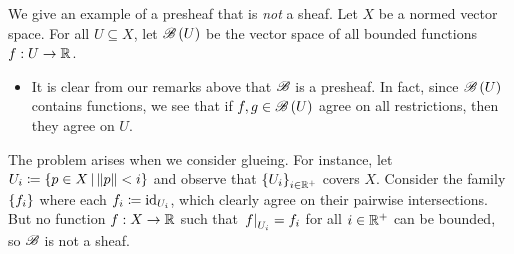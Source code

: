 \documentclass[../Moduli_Spaces_of_Riemann_Surfaces.tex]{subfiles}
\begin{document}
    \vspace{-0.05in}
    \begin{example}
        We give an example of a presheaf that is \textit{not} a sheaf. Let $X$ be a normed vector space. For all $U\subseteq X$, let $\mathscr{B}\left(U\right)$ be the vector space of all bounded functions $f:U\to\mathbb{R}$.
        \begin{itemize}
            \item It is clear from our remarks above that $\mathscr{B}$ is a presheaf. In fact, since $\mathscr{B}\left(U\right)$ contains functions, we see that if $f,g\in\mathscr{B}\left(U\right)$ agree on all restrictions, then they agree on $U$.
        \end{itemize}
        The problem arises when we consider glueing. For instance, let $U_i\coloneqq\left\{p\in X\,\middle\vert\,\left\|p\right\|<i\right\}$ and observe that $\left\{U_i\right\}_{i\in\mathbb{R}^+}$ covers $X$. Consider the family $\left\{f_i\right\}$ where each $f_i\coloneqq\operatorname{id}_{U_i}$, which clearly agree on their pairwise intersections. But no function $f:X\to\mathbb{R}$ such that $\left.f\right|_{U_i}=f_i$ for all $i\in\mathbb{R}^+$ can be bounded, so $\mathscr{B}$ is not a sheaf.\exqed
    \end{example}
\end{document}
